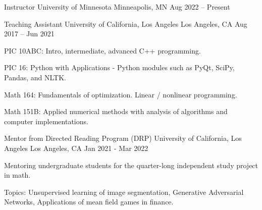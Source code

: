 

\begin{cventries}

  \cventry
    {Instructor} %
    {University of Minnesota} %
    {Minneapolis, MN} %
    {Aug 2022 – Present} %
    {
      \begin{cvteachings}
      \end{cvteachings}
    }

  \cventry
    {Teaching Assistant} %
    {University of California, Los Angeles} %
    {Los Angeles, CA} %
    {Aug 2017 – Jun 2021} %
    {
      \begin{cvitems} %
        \item {PIC 10ABC: Intro, intermediate, advanced C++ programming.}
        \item {PIC 16: Python with Applications} - Python modules such as PyQt, SciPy, Pandas, and NLTK.
        \item {Math 164: Fundamentals of optimization. Linear / nonlinear programming}.
        \item {Math 151B: Applied numerical methods with analysis of algorithms and computer implementations}.
      \end{cvitems}
    }

  \cventry
    {Mentor from Directed Reading Program (DRP)} %
    {University of California, Los Angeles} %
    {Los Angeles, CA} %
    {Jan 2021 - Mar 2022} %
    {
      \begin{cvitems} %
        \item Mentoring undergraduate students for the quarter-long independent study project in math.
        \item Topics: Unsupervised learning of image segmentation, Generative Adversarial Networks, Applications of mean field games in finance.
      \end{cvitems}
    }

\end{cventries}
